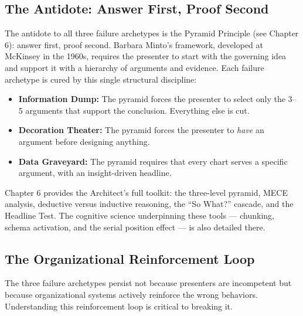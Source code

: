 \subsection{The Antidote: Answer First, Proof Second}

The antidote to all three failure archetypes is the Pyramid Principle (see Chapter 6): answer first, proof second. Barbara Minto's framework, developed at McKinsey in the 1960s, requires the presenter to start with the governing idea and support it with a hierarchy of arguments and evidence. Each failure archetype is cured by this single structural discipline:

\begin{itemize}
  \item \textbf{Information Dump:} The pyramid forces the presenter to select only the 3--5 arguments that support the conclusion. Everything else is cut.
  \item \textbf{Decoration Theater:} The pyramid forces the presenter to \emph{have} an argument before designing anything.
  \item \textbf{Data Graveyard:} The pyramid requires that every chart serves a specific argument, with an insight-driven headline.
\end{itemize}


Chapter 6 provides the Architect's full toolkit: the three-level pyramid, MECE analysis, deductive versus inductive reasoning, the ``So What?'' cascade, and the Headline Test. The cognitive science underpinning these tools --- chunking, schema activation, and the serial position effect --- is also detailed there.

\subsection{The Organizational Reinforcement Loop}

The three failure archetypes persist not because presenters are incompetent but because organizational systems actively reinforce the wrong behaviors. Understanding this reinforcement loop is critical to breaking it.

